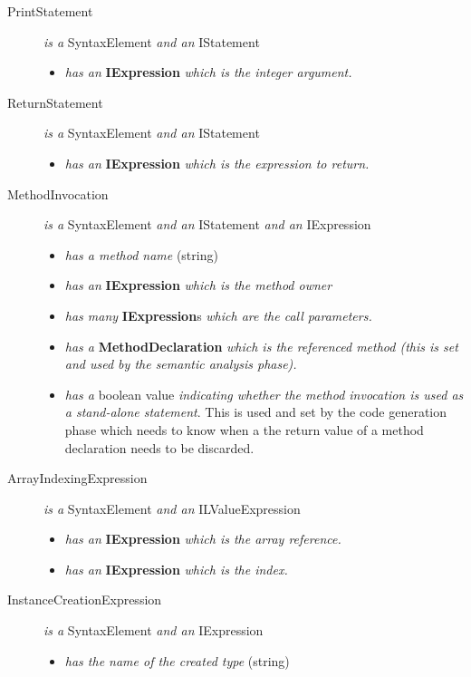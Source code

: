 \documentclass[a4paper,11pt]{article}
\begin{document}
\begin{description}
\begin{itemize}
      \end{itemize}
    \item[PrintStatement] \emph{is a} SyntaxElement \emph{and an} IStatement
      \begin{itemize}
        \item \emph{has an} \textbf{IExpression} \emph{which is the integer argument.}
      \end{itemize}
    \item[ReturnStatement] \emph{is a} SyntaxElement \emph{and an} IStatement
      \begin{itemize}
        \item \emph{has an} \textbf{IExpression} \emph{which is the expression to return.}
      \end{itemize}
    \item[MethodInvocation] \emph{is a} SyntaxElement \emph{and an} IStatement \emph{and an} IExpression
      \begin{itemize}
        \item \emph{has a method name} (string)
        \item \emph{has an} \textbf{IExpression} \emph{which is the method owner}
        \item \emph{has many} \textbf{IExpression}s \emph{which are the call parameters.}
        \item \emph{has a} \textbf{MethodDeclaration} \emph{which is the referenced method (this is set and used by the semantic analysis phase).}
        \item \emph{has a} boolean value \emph{indicating whether the method invocation is used as a stand-alone statement}. This is used and set by the code generation phase which needs to know when a the return value of a method declaration needs to be discarded.
      \end{itemize}
    \item[ArrayIndexingExpression] \emph{is a} SyntaxElement \emph{and an} ILValueExpression
      \begin{itemize}
        \item \emph{has an} \textbf{IExpression} \emph{which is the array reference.}
        \item \emph{has an} \textbf{IExpression} \emph{which is the index.}
      \end{itemize}
    \item[InstanceCreationExpression] \emph{is a} SyntaxElement \emph{and an} IExpression
      \begin{itemize}
        \item \emph{has the name of the created type} (string)

\end{itemize}
\end{description}
\end{document}
